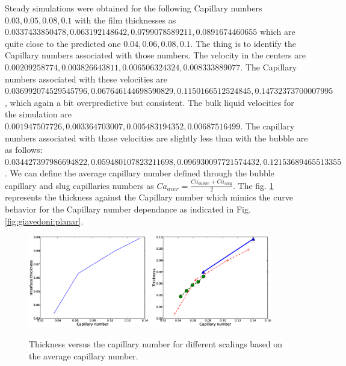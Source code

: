 \documentclass{article}
\begin{document}
Steady simulations were obtained for the following Capillary numbers
$0.03,0.05,0.08,0.1$ with the film thicknesses as
$0.0337433850478, 0.063192148642, 0.0799078589211, 0.0891674460655$ which are
quite close to the predicted one $0.04,0.06,0.08,0.1$. The thing is to identify
the Capillary numbers associated with those numbers. The velocity in the
centers are $0.00209258774,0.003826643811,0.006506324324,0.008333889077$. The
Capillary numbers associated with these velocities are $0.036992074529545796, 
0.067646144698590829,0.1150166512524845,0.14732373700007995$, which again a bit
overpredictive but consistent. The bulk liquid velocities for the simulation
are $0.001947507726,0.003364703007,0.005483194352,0.00687516499$. The capillary
numbers associated with those velocities are slightly less than with the bubble
are as follows:$0.034427397986694822, 0.059480107823211698,
0.096930097721574432, 0.12153689465513355$. We can define the average capillary
number defined through the bubble capillary and slug capillaries numbers as
$Ca_{aver}=\frac{Ca_{bubble}+Ca_{slug}}{2}$. The fig.
\ref{fig:capillary:simple} represents the thickness against the Capillary
number which mimics the curve behavior for the Capillary number dependance as
indicated in Fig. \ref{fig:giavedoni:planar}.
\begin{figure}
\includegraphics[width=0.47\textwidth]{Figures/capillary_thickness_simple.eps}
\hfill
\includegraphics[width=0.47\textwidth]{Figures/capillary_range.eps}
\caption{Thickness versus the capillary number for different scalings based on
the average capillary number. \label{fig:capillary:simple}}
\end{figure}
 
\end{document}
